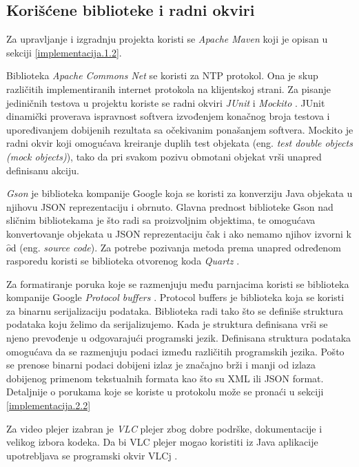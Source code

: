 \documentclass[12pt,oneside]{memoir}
\begin{document}
\subsection{Korišćene biblioteke i radni okviri}
\label{implementacija.2.1}

Za upravljanje i izgradnju projekta koristi se \textit{Apache Maven} \cite{Maven} koji je opisan u sekciji \ref{implementacija.1.2}. 

Biblioteka \textit{Apache Commons Net} \cite{CommonsNet} se koristi za NTP protokol. Ona je skup različitih implementiranih internet protokola na klijentskoj strani. Za pisanje jediničnih testova u projektu koriste se radni okviri \textit{JUnit} \cite{Junit} i \textit{Mockito} \cite{Mockito}. JUnit dinamički proverava ispravnost softvera izvođenjem konačnog broja testova i upoređivanjem dobijenih rezultata sa očekivanim ponašanjem softvera. Mockito je radni okvir koji omogućava kreiranje duplih test objekata (eng. \textit{test double objects (mock objects)}), tako da pri svakom pozivu obmotani objekat vrši unapred definisanu akciju.

\textit{Gson} \cite{Gson} je biblioteka kompanije Google koja se koristi za konverziju Java objekata u njihovu JSON reprezentaciju i obrnuto. Glavna prednost biblioteke Gson nad sličnim bibliotekama je što radi sa proizvoljnim objektima, te omogućava konvertovanje objekata u JSON reprezentaciju čak i ako nemamo njihov izvorni k$\hat{o}$d (eng. \textit{source code}). Za potrebe pozivanja metoda prema unapred određenom rasporedu koristi se biblioteka otvorenog koda \textit{Quartz} \cite{Quartz}. 

Za formatiranje poruka koje se razmenjuju među parnjacima koristi se biblioteka kompanije Google \textit{Protocol buffers} \cite{ProtocolBuffers}. Protocol buffers je biblioteka koja se koristi za binarnu serijalizaciju podataka. Biblioteka radi tako što se definiše struktura podataka koju želimo da serijalizujemo. Kada je struktura definisana vrši se njeno prevođenje u odgovarajući programski jezik. Definisana struktura podataka omogućava da se razmenjuju podaci između različitih programskih jezika. Pošto se prenose binarni podaci dobijeni izlaz je značajno brži i manji od izlaza dobijenog primenom tekstualnih formata kao što su XML ili JSON format. Detaljnije o porukama koje se koriste u protokolu može se pronaći u sekciji \ref{implementacija.2.2} 

Za video plejer izabran je \textit{VLC} plejer \cite{VLC} zbog dobre podrške, dokumentacije i velikog izbora kodeka. Da bi VLC plejer mogao koristiti iz Java aplikacije upotrebljava se programski okvir VLCj \cite{VLCJ}. 
\end{document}
